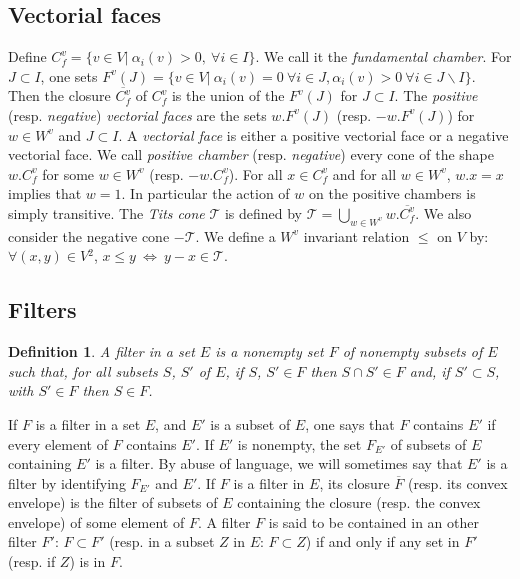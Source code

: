 \documentclass[12pt]{article}
\theoremstyle{plain}
\newtheorem{definition}[theorem]{Definition}
\theoremstyle{definition}
\begin{document}
\subsection{Vectorial faces}

Define $C_f^v=\{v\in V|\  \alpha_i(v)>0,\ \forall i\in I\}$. We call it the \textit{fundamental chamber}. For $J\subset I$, one sets $F^v(J)=\{v\in V|\ \alpha_i(v)=0\ \forall i\in J,\alpha_i(v)>0\ \forall i\in J\backslash I\}$. Then the closure $\overline{C_f^v}$ of $C_f^v$ is the union of the $F^v(J)$ for $J\subset I$. The \textit{positive} (resp. \textit{negative}) \textit{vectorial faces} are the sets $w.F^v(J)$ (resp. $-w.F^v(J)$) for $w\in W^v$  and $J\subset I$. A \textit{vectorial face} is either a positive vectorial face or a negative vectorial face. We call \textit{positive chamber} (resp. \textit{negative}) every cone  of the shape $w.C_f^v$ for some $w\in W^v$ (resp. $-w.C_f^v$).  For all $x\in C_f^v$ and for all $w\in W^v$, $w.x=x$ implies that $w=1$. In particular the action of $w$ on the positive chambers is simply transitive. The \textit{Tits cone} $\mathcal T$ is defined by $\mathcal{T}=\bigcup_{w\in W^v} w.\overline{C^v_f}$. We also consider the negative cone $-\mathcal{T}$.
We define a $W^v$ invariant relation $\leq$ on $V$ by: $\forall (x,y)\in V\mathrm{}^2$, $x\leq y\ \Leftrightarrow\ y-x\in \mathcal{T}$.


\subsection{Filters}

\begin{definition}
A filter in a set $E$ is a nonempty set $F$ of nonempty subsets of $E$ such that, for all subsets $S$, $S'$ of $E$,  if $S$, $S'\in F$ then $S\cap S'\in F$ and, if $S'\subset S$, with $S'\in F$ then $S\in F$.
\end{definition}

If $F$ is a filter in a set $E$, and $E'$ is a subset of $E$, one says that $F$ contains $E'$ if every element of $F$ contains $E'$. If $E'$ is nonempty, the set $F_{E'}$ of subsets of $E$ containing $E'$ is a filter. By abuse of language, we will sometimes say that $E'$ is a filter by identifying $F_{E'}$ and $E'$. If $F$ is a filter in $E$, its closure $\overline F$ (resp. its convex envelope) is the filter of subsets of $E$ containing the closure (resp. the convex envelope) of some element of $F$. A filter $F$ is said to be contained in an other filter $F'$: $F\subset F'$ (resp. in a subset $Z$ in $E$: $F\subset Z$) if and only if any set in $F'$ (resp. if $Z$) is in $F$.
\end{document}

